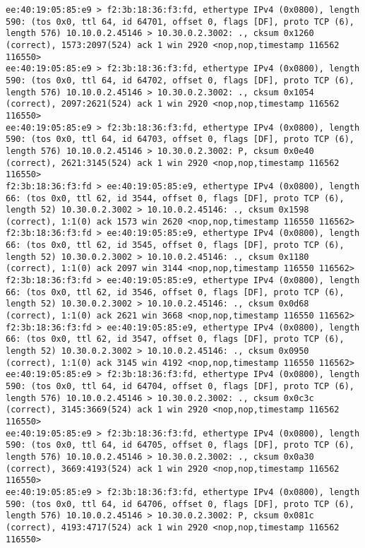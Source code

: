 \documentclass[a4paper,12pt]{article}
\begin{document}
\begin{Verbatim}
ee:40:19:05:85:e9 > f2:3b:18:36:f3:fd, ethertype IPv4 (0x0800), length 590: (tos 0x0, ttl 64, id 64701, offset 0, flags [DF], proto TCP (6), length 576) 10.10.0.2.45146 > 10.30.0.2.3002: ., cksum 0x1260 (correct), 1573:2097(524) ack 1 win 2920 <nop,nop,timestamp 116562 116550>
ee:40:19:05:85:e9 > f2:3b:18:36:f3:fd, ethertype IPv4 (0x0800), length 590: (tos 0x0, ttl 64, id 64702, offset 0, flags [DF], proto TCP (6), length 576) 10.10.0.2.45146 > 10.30.0.2.3002: ., cksum 0x1054 (correct), 2097:2621(524) ack 1 win 2920 <nop,nop,timestamp 116562 116550>
ee:40:19:05:85:e9 > f2:3b:18:36:f3:fd, ethertype IPv4 (0x0800), length 590: (tos 0x0, ttl 64, id 64703, offset 0, flags [DF], proto TCP (6), length 576) 10.10.0.2.45146 > 10.30.0.2.3002: P, cksum 0x0e40 (correct), 2621:3145(524) ack 1 win 2920 <nop,nop,timestamp 116562 116550>
f2:3b:18:36:f3:fd > ee:40:19:05:85:e9, ethertype IPv4 (0x0800), length 66: (tos 0x0, ttl 62, id 3544, offset 0, flags [DF], proto TCP (6), length 52) 10.30.0.2.3002 > 10.10.0.2.45146: ., cksum 0x1598 (correct), 1:1(0) ack 1573 win 2620 <nop,nop,timestamp 116550 116562>
f2:3b:18:36:f3:fd > ee:40:19:05:85:e9, ethertype IPv4 (0x0800), length 66: (tos 0x0, ttl 62, id 3545, offset 0, flags [DF], proto TCP (6), length 52) 10.30.0.2.3002 > 10.10.0.2.45146: ., cksum 0x1180 (correct), 1:1(0) ack 2097 win 3144 <nop,nop,timestamp 116550 116562>
f2:3b:18:36:f3:fd > ee:40:19:05:85:e9, ethertype IPv4 (0x0800), length 66: (tos 0x0, ttl 62, id 3546, offset 0, flags [DF], proto TCP (6), length 52) 10.30.0.2.3002 > 10.10.0.2.45146: ., cksum 0x0d68 (correct), 1:1(0) ack 2621 win 3668 <nop,nop,timestamp 116550 116562>
f2:3b:18:36:f3:fd > ee:40:19:05:85:e9, ethertype IPv4 (0x0800), length 66: (tos 0x0, ttl 62, id 3547, offset 0, flags [DF], proto TCP (6), length 52) 10.30.0.2.3002 > 10.10.0.2.45146: ., cksum 0x0950 (correct), 1:1(0) ack 3145 win 4192 <nop,nop,timestamp 116550 116562>
ee:40:19:05:85:e9 > f2:3b:18:36:f3:fd, ethertype IPv4 (0x0800), length 590: (tos 0x0, ttl 64, id 64704, offset 0, flags [DF], proto TCP (6), length 576) 10.10.0.2.45146 > 10.30.0.2.3002: ., cksum 0x0c3c (correct), 3145:3669(524) ack 1 win 2920 <nop,nop,timestamp 116562 116550>
ee:40:19:05:85:e9 > f2:3b:18:36:f3:fd, ethertype IPv4 (0x0800), length 590: (tos 0x0, ttl 64, id 64705, offset 0, flags [DF], proto TCP (6), length 576) 10.10.0.2.45146 > 10.30.0.2.3002: ., cksum 0x0a30 (correct), 3669:4193(524) ack 1 win 2920 <nop,nop,timestamp 116562 116550>
ee:40:19:05:85:e9 > f2:3b:18:36:f3:fd, ethertype IPv4 (0x0800), length 590: (tos 0x0, ttl 64, id 64706, offset 0, flags [DF], proto TCP (6), length 576) 10.10.0.2.45146 > 10.30.0.2.3002: P, cksum 0x081c (correct), 4193:4717(524) ack 1 win 2920 <nop,nop,timestamp 116562 116550>

\end{Verbatim}
\end{document}
